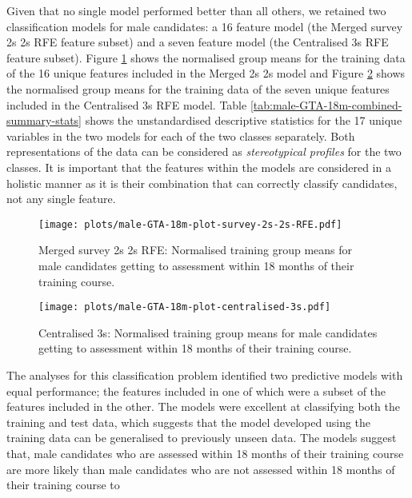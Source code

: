 \documentclass[
  12pt,
  a4paper,
]{book}
\begin{document}
Given that no single model performed better than all others, we retained two classification models for male candidates: a 16 feature model (the Merged survey 2s 2s RFE feature subset) and a seven feature model (the Centralised 3s RFE feature subset). Figure \ref{fig:male-GTA-18m-plot-survey-2s-2s-RFE} shows the normalised group means for the training data of the 16 unique features included in the Merged 2s 2s model and Figure \ref{fig:male-GTA-18m-plot-centralised-3s} shows the normalised group means for the training data of the seven unique features included in the Centralised 3s RFE model. Table \ref{tab:male-GTA-18m-combined-summary-stats} shows the unstandardised descriptive statistics for the 17 unique variables in the two models for each of the two classes separately. Both representations of the data can be considered as \emph{stereotypical profiles} for the two classes. It is important that the features within the models are considered in a holistic manner as it is their combination that can correctly classify candidates, not any single feature.

\begin{figure}
\centering
\texttt{[image: plots/male-GTA-18m-plot-survey-2s-2s-RFE.pdf]}
\caption{\label{fig:male-GTA-18m-plot-survey-2s-2s-RFE}Merged survey 2s 2s RFE: Normalised training group means for male candidates getting to assessment within 18 months of their training course.}
\end{figure}

\begin{figure}
\centering
\texttt{[image: plots/male-GTA-18m-plot-centralised-3s.pdf]}
\caption{\label{fig:male-GTA-18m-plot-centralised-3s}Centralised 3s: Normalised training group means for male candidates getting to assessment within 18 months of their training course.}
\end{figure}

The analyses for this classification problem identified two predictive models with equal performance; the features included in one of which were a subset of the features included in the other. The models were excellent at classifying both the training and test data, which suggests that the model developed using the training data can be generalised to previously unseen data. The models suggest that, male candidates who are assessed within 18 months of their training course are more likely than male candidates who are not assessed within 18 months of their training course to
\end{document}

